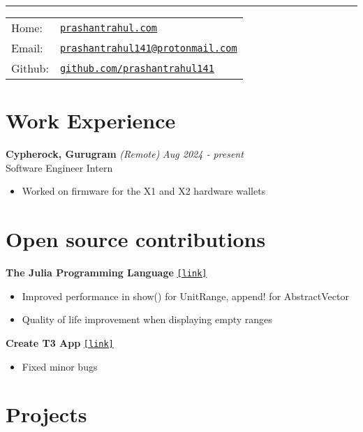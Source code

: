 \documentclass[a4paper,11pt]{article}
\begin{document}
 \vspace{0.5em}

\hrule\vspace{1em}

\noindent
\begin{tabular}{@{}l l}
Home: & \href{https://prashantrahul.com}{\texttt{prashantrahul.com}} \\
Email: & \href{mailto:prashantrahul141@protonmail.com}{\texttt{prashantrahul141@protonmail.com}} \\
Github: & \href{https://github.com/prashantrahul141}{\texttt{github.com/prashantrahul141}} \\
\end{tabular}

\section*{Work Experience}

\noindent\textbf{Cypherock, Gurugram} \textit{(Remote)} \hfill \textit{Aug 2024 - present}\\
\noindent Software Engineer Intern
\begin{itemize}[noitemsep, topsep=0pt]
    \item Worked on firmware for the X1 and X2 hardware wallets
\end{itemize}


\section*{Open source contributions}

\noindent\textbf{The Julia Programming Language} \hfill \href{https://github.com/JuliaLang/julia/issues?q=author%3Aprashantrahul141}{\texttt{[link]}}
\begin{itemize}[noitemsep, topsep=0pt]
    \item Improved performance in show() for UnitRange, append! for AbstractVector
    \item Quality of life improvement when displaying empty ranges \vspace{0.5em}
\end{itemize}

\noindent\textbf{Create T3 App} \hfill \href{https://github.com/t3-oss/create-t3-app/pulls?q=is%3Apr+author%3Aprashantrahul141}{\texttt{[link]}}
\begin{itemize}[noitemsep, topsep=0pt]
    \item Fixed minor bugs \vspace{0.5em}
\end{itemize}

\section*{Projects}
\end{document}
